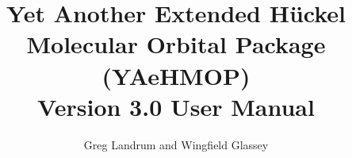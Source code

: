 \documentclass{report}
\begin{document}
\fontsize{12}{14}\selectfont

\title{ Yet Another Extended H\"{u}ckel Molecular Orbital Package \\
 (YAeHMOP) \\
 Version 3.0 User Manual}

\author{Greg Landrum and Wingfield Glassey}

\maketitle

\tableofcontents

\newpage










































\end{document}
